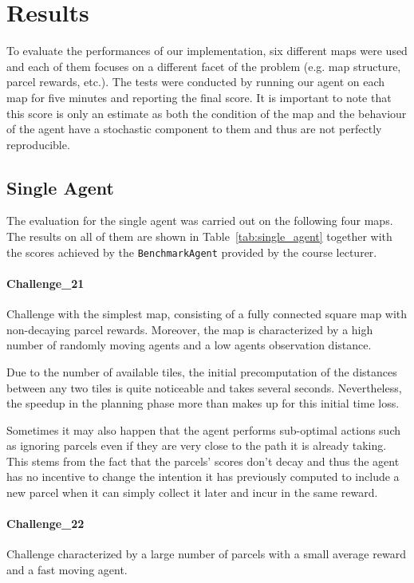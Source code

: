 \section{Results}
\label{sec:results}

To evaluate the performances of our implementation, six different maps were used and each of them focuses on a different facet of the problem (e.g. map structure, parcel rewards, etc.). The tests were conducted by running our agent on each map for five minutes and reporting the final score. It is important to note that this score is only an estimate as both the condition of the map and the behaviour of the agent have a stochastic component to them and thus are not perfectly reproducible.

\subsection{Single Agent}
The evaluation for the single agent was carried out on the following four maps. The results on all of them are shown in Table~\ref{tab:single_agent} together with the scores achieved by the \texttt{BenchmarkAgent} provided by the course lecturer.

\paragraph{Challenge\_21} Challenge with the simplest map, consisting of a fully connected square map with non-decaying parcel rewards. Moreover, the map is characterized by a high number of randomly moving agents and a low agents observation distance.

Due to the number of available tiles, the initial precomputation of the distances between any two tiles is quite noticeable and takes several seconds. Nevertheless, the speedup in the planning phase more than makes up for this initial time loss.

Sometimes it may also happen that the agent performs sub-optimal actions such as ignoring parcels even if they are very close to the path it is already taking. This stems from the fact that the parcels' scores don't decay and thus the agent has no incentive to change the intention it has previously computed to include a new parcel when it can simply collect it later and incur in the same reward.
\paragraph{Challenge\_22} Challenge characterized by a large number of parcels with a small average reward and a fast moving agent.

